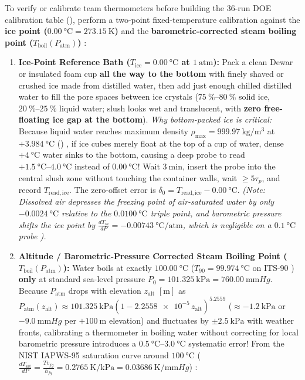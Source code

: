 To verify or calibrate team thermometers before building the 36-run DOE calibration table (), perform a two-point fixed-temperature calibration against the \textbf{ice point ($\SI{0.00}{\celsius} = \SI{273.15}{\kelvin}$)} and the \textbf{barometric-corrected steam boiling point ($T_{\mathrm{boil}}(P_{\mathrm{atm}})$)} :
\begin{enumerate}
  \item \textbf{Ice-Point Reference Bath ($T_{\mathrm{ice}} = \SI{0.00}{\celsius}$ at $\SI{1}{\text{atm}}$):} 
  Pack a clean Dewar or insulated foam cup \textbf{all the way to the bottom} with finely shaved or crushed ice made from distilled water, then add just enough chilled distilled water to fill the pore spaces between ice crystals ($\SIrange{75}{80}{\percent}$ solid ice, $\SIrange{20}{25}{\percent}$ liquid water; slush looks wet and translucent, with \textbf{zero free-floating ice gap at the bottom}).
  \emph{Why bottom-packed ice is critical:} Because liquid water reaches maximum density $\rho_{\max} = \SI{999.97}{\kilogram\per\cubic\meter}$ at $+\SI{3.984}{\celsius}$ () , if ice cubes merely float at the top of a cup of water, dense $+\SI{4}{\celsius}$ water sinks to the bottom, causing a deep probe to read $+\SIrange{1.5}{4.0}{\celsius}$ instead of $\SI{0.00}{\celsius}$! Wait $\SI{3}{\minute}$, insert the probe into the central slush zone without touching the container walls, wait $\ge 5\tau_p$, and record $T_{\mathrm{read,ice}}$. The zero-offset error is $\delta_0 = T_{\mathrm{read,ice}} - \SI{0.00}{\celsius}$. \emph{(Note: Dissolved air depresses the freezing point of air-saturated water by only $\SI{-0.0024}{\celsius}$ relative to the $\SI{0.0100}{\celsius}$ triple point, and barometric pressure shifts the ice point by $\frac{dT_m}{dP} = \SI{-0.00743}{\celsius\per\text{atm}}$, which is negligible on a $\SI{0.1}{\celsius}$ probe ).}
  \item \textbf{Altitude / Barometric-Pressure Corrected Steam Boiling Point ($T_{\mathrm{boil}}(P_{\mathrm{atm}})$):}
  Water boils at exactly $\SI{100.00}{\celsius}$ ($T_{90} = \SI{99.974}{\celsius}$ on ITS-90 ) \textbf{only} at standard sea-level pressure $P_0 = \SI{101.325}{\kilo\pascal} = \SI{760.00}{\milli\meter Hg}$. Because $P_{\mathrm{atm}}$ drops with elevation $z_{\mathrm{alt}}$ $[\si{\meter}]$ as $P_{\mathrm{atm}}(z_{\mathrm{alt}}) \approx \SI{101.325}{\kilo\pascal}\left(1 - \num{2.2558e-5}\,z_{\mathrm{alt}}\right)^{5.2559}$ ($\approx -\SI{1.2}{\kilo\pascal}$ or $-\SI{9.0}{\milli\meter Hg}$ per $+\SI{100}{\meter}$ elevation) and fluctuates by $\pm\SI{2.5}{\kilo\pascal}$ with weather fronts, calibrating a thermometer in boiling water without correcting for local barometric pressure introduces a $\SIrange{0.5}{3.0}{\celsius}$ systematic error! From the NIST IAPWS-95 saturation curve around $\SI{100}{\celsius}$ ($\frac{dT_{\mathrm{sat}}}{dP} = \frac{T v_{fg}}{h_{fg}} = \SI{0.2765}{\kelvin\per\kilo\pascal} = \SI{0.03686}{\kelvin\per\milli\meter Hg}$) :

\end{enumerate}
